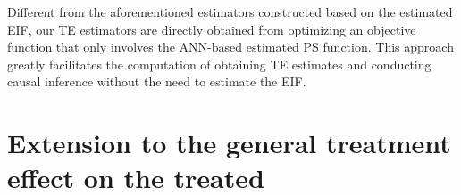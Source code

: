 \documentclass[11pt]{article}
\numberwithin{equation}{section}
\begin{document}
Different from the aforementioned estimators constructed based on the
estimated EIF, our TE estimators are directly obtained from optimizing an
objective function that only involves the ANN-based estimated PS function.
This approach greatly facilitates the computation of obtaining TE estimates
and conducting causal inference without the need to estimate the EIF. %





%
%


\section{Extension to the general treatment effect on the treated}\label{sec:GTT}
\end{document}
